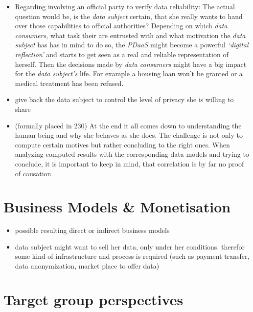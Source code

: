 \documentclass[12pt,english,a4paper,titlepage,cleardoublepage=empty,dottedtoc]{report}
\providecommand{\tightlist}{%
  \setlength{\itemsep}{0pt}\setlength{\parskip}{0pt}}
\begin{document}
\begin{itemize}
\item
  Regarding involving an official party to verify data reliability: The
  actual question would be, is the \emph{data subject} certain, that she
  really wants to hand over those capabilities to official authorities?
  Depending on which \emph{data consumers}, what task their are
  entrusted with and what motivation the \emph{data subject} has has in
  mind to do so, the \emph{PDaaS} might become a powerful \emph{`digital
  reflection'} and starts to get seen as a real and reliable
  representation of herself. Then the decisions made by \emph{data
  consumers} might have a big impact for the \emph{data subject's} life.
  For example a housing loan won't be granted or a medical treatment has
  been refused.
\item
  give back the data subject to control the level of privacy she is
  willing to share
\item
  (formally placed in 230) At the end it all comes down to understanding
  the human being and why she behaves as she does. The challenge is not
  only to compute certain motives but rather concluding to the right
  ones. When analyzing computed results with the corresponding data
  models and trying to conclude, it is important to keep in mind, that
  correlation is by far no proof of causation.
\end{itemize}

\section{Business Models \&
Monetisation}\label{business-models-monetisation}

\begin{itemize}
\tightlist
\item
  possible resulting direct or indirect business models
\item
  data subject might want to sell her data, only under her conditions.
  therefor some kind of infrastructure and process is required (such as
  payment transfer, data anonymization, market place to offer data)
\end{itemize}

\section{Target group perspectives}\label{target-group-perspectives}
\end{document}
